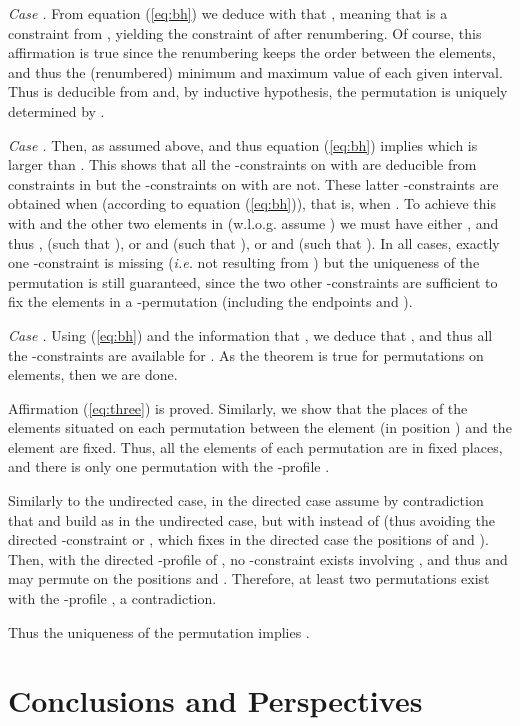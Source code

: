 \documentclass{article}
\begin{document}
{\sl Case .} From equation (\ref{eq:bh}) we deduce with  that ,
meaning that  is
a constraint from , yielding the constraint 
of  after renumbering. Of course, this affirmation is true since the renumbering
keeps the order between the elements, and thus the (renumbered) minimum and maximum value of each
given interval. Thus  is deducible from  and, by inductive hypothesis, the
permutation  is uniquely determined by .

{\sl Case .} Then, as assumed above,  and thus  equation (\ref{eq:bh}) implies 
 which is larger than . This shows that all the -constraints
on  with  are deducible from constraints in  but the 
-constraints on  with  are not. These latter -constraints 
are obtained when  (according to equation (\ref{eq:bh})), that is, when
. To achieve this with  and the other two elements  in  (w.l.o.g. assume
) we must have either , and thus , (such that ), or  and  (such that
), or  and  (such that ). In all cases, exactly one -constraint is missing
({\em i.e.} not resulting from ) but the uniqueness of the permutation is still guaranteed,
since the two other -constraints are sufficient to fix the elements in a -permutation (including
the endpoints  and ).

{\sl Case .} Using (\ref{eq:bh}) and the information that , we deduce that 
, and thus all the -constraints are available for .
As the theorem is true for permutations on  elements, then we are done.

Affirmation (\ref{eq:three}) is proved.
Similarly, we show that the places of the elements situated on each permutation  between the element 
(in position ) and the element  are fixed. Thus, all the elements of each permutation  are  in
fixed places, and there is only one permutation  with the -profile .  
\medskip

 Similarly to the undirected case, in the directed case assume by contradiction that 
 and build  as in the
undirected case, but with  instead of  (thus avoiding  the directed
-constraint  or  , which fixes in the directed case
the positions of   and ). 
Then, with the directed -profile  of , no -constraint exists involving , 
and thus  and  may permute on the positions  and . Therefore, at least two permutations exist
with the -profile , a contradiction.

Thus the uniqueness of the permutation implies . 



\section{Conclusions and Perspectives}\label{sect:Conclusion}
\end{document}
